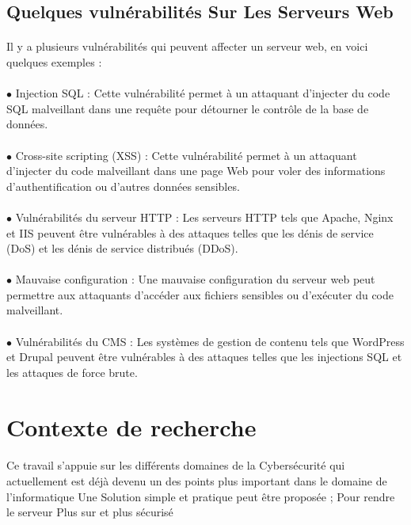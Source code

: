 \documentclass{report}
\begin{document}
  \subsection{Quelques vulnérabilités Sur Les Serveurs Web }
  \paragraph{ }
  Il y a plusieurs vulnérabilités qui peuvent affecter un serveur web, en voici quelques exemples :
  \paragraph{ }
  $\bullet$ Injection SQL : Cette vulnérabilité permet à un attaquant d'injecter du code SQL malveillant dans une requête pour détourner le contrôle de la base de données.
  \paragraph{ }
  $\bullet$ Cross-site scripting (XSS) : Cette vulnérabilité permet à un attaquant d'injecter du code malveillant dans une page Web pour voler des informations d'authentification ou d'autres données sensibles.
  \paragraph{ }
  $\bullet$ Vulnérabilités du serveur HTTP : Les serveurs HTTP tels que Apache, Nginx et IIS peuvent être vulnérables à des attaques telles que les dénis de service (DoS) et les dénis de service distribués (DDoS).
  \paragraph{ }
  $\bullet$ Mauvaise configuration : Une mauvaise configuration du serveur web peut permettre aux attaquants d'accéder aux fichiers sensibles ou d'exécuter du code malveillant.
  \paragraph{ }
  $\bullet$ Vulnérabilités du CMS : Les systèmes de gestion de contenu tels que WordPress et Drupal peuvent être vulnérables à des attaques telles que les injections SQL et les attaques de force brute.
  
  
   \section{Contexte de recherche }
   \paragraph{ } Ce travail s'appuie sur les différents domaines   de la  Cybersécurité qui actuellement est déjà devenu un  des points  plus   important dans le domaine de l'informatique 
   Une Solution simple et pratique peut être proposée  \space;
   Pour rendre le serveur Plus sur et plus sécurisé
\end{document}
